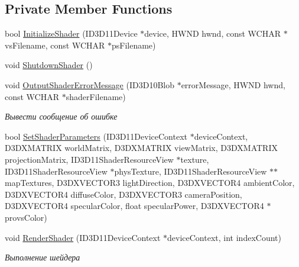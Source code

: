 \subsection*{Private Member Functions}
\begin{DoxyCompactItemize}
\item 
bool \hyperlink{class_terrain_shader_class_a4df8848ffd77210786a1963d5f3bddae}{Initialize\+Shader} (I\+D3\+D11\+Device $\ast$device, H\+W\+ND hwnd, const W\+C\+H\+AR $\ast$vs\+Filename, const W\+C\+H\+AR $\ast$ps\+Filename)
\item 
void \hyperlink{class_terrain_shader_class_a09645a09e8875eb09f6883d03eb11d89}{Shutdown\+Shader} ()
\item 
void \hyperlink{class_terrain_shader_class_ae9f1290e8f646b65464a12784ed904d5}{Output\+Shader\+Error\+Message} (I\+D3\+D10\+Blob $\ast$error\+Message, H\+W\+ND hwnd, const W\+C\+H\+AR $\ast$shader\+Filename)
\begin{DoxyCompactList}\small\item\em Вывести сообщение об ошибке \end{DoxyCompactList}\item 
bool \hyperlink{class_terrain_shader_class_a67bd97eb1a37bd7343dfdb0bb63ca7a0}{Set\+Shader\+Parameters} (I\+D3\+D11\+Device\+Context $\ast$device\+Context, D3\+D\+X\+M\+A\+T\+R\+IX world\+Matrix, D3\+D\+X\+M\+A\+T\+R\+IX view\+Matrix, D3\+D\+X\+M\+A\+T\+R\+IX projection\+Matrix, I\+D3\+D11\+Shader\+Resource\+View $\ast$texture, I\+D3\+D11\+Shader\+Resource\+View $\ast$phys\+Texture, I\+D3\+D11\+Shader\+Resource\+View $\ast$$\ast$map\+Textures, D3\+D\+X\+V\+E\+C\+T\+O\+R3 light\+Direction, D3\+D\+X\+V\+E\+C\+T\+O\+R4 ambient\+Color, D3\+D\+X\+V\+E\+C\+T\+O\+R4 diffuse\+Color, D3\+D\+X\+V\+E\+C\+T\+O\+R3 camera\+Position, D3\+D\+X\+V\+E\+C\+T\+O\+R4 specular\+Color, float specular\+Power, D3\+D\+X\+V\+E\+C\+T\+O\+R4 $\ast$provs\+Color)
\item 
void \hyperlink{class_terrain_shader_class_a41265414580a443b8e7cb26f86bbf5d3}{Render\+Shader} (I\+D3\+D11\+Device\+Context $\ast$device\+Context, int index\+Count)
\begin{DoxyCompactList}\small\item\em Выполнение шейдера \end{DoxyCompactList}\end{DoxyCompactItemize}
